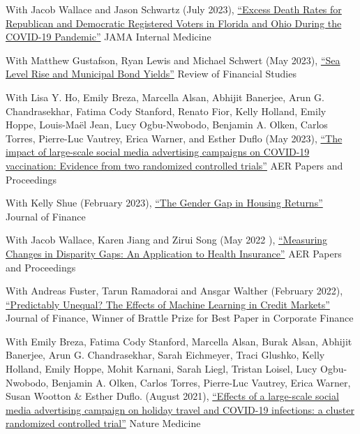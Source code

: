 \documentclass[letterpaper]{article}
\renewenvironment{itemize}{
  \begin{list}{}
    { \setlength{\itemsep}{5pt}
      \setlength{\parsep}{0pt}
      \setlength{\topsep}{0pt}
      \setlength{\leftmargin}{0em} } }{
  \end{list}}
\begin{document}
\begin{itemize}
\item With Jacob Wallace and Jason Schwartz (July 2023), \href{https://jamanetwork.com/journals/jamainternalmedicine/fullarticle/2807617}{``Excess Death Rates for Republican and Democratic Registered Voters in Florida and Ohio During the COVID-19 Pandemic''} JAMA Internal Medicine
\item With Matthew Gustafson, Ryan Lewis and Michael Schwert (May 2023), \href{http://paulgp.github.io/papers/ggls_munis.pdf}{``Sea Level Rise and Municipal Bond Yields''} Review of Financial Studies
\item With Lisa Y. Ho, Emily Breza, Marcella Alsan, Abhijit Banerjee, Arun G. Chandrasekhar, Fatima Cody Stanford, Renato Fior, Kelly Holland, Emily Hoppe, Louis-Maël Jean, Lucy Ogbu-Nwobodo, Benjamin A. Olken, Carlos Torres, Pierre-Luc Vautrey, Erica Warner, and Esther Duflo (May 2023), \href{https://paulgp.github.io/papers/submission_manuscript_appendix_social_media_covid_vaccines.pdf}{``The impact of large-scale social media advertising campaigns on COVID-19 vaccination: Evidence from two randomized controlled trials''} AER Papers and Proceedings
\item With Kelly Shue (February 2023), \href{https://paulgp.github.io/papers/Gender_Gap_in_Housing_Returns.pdf}{``The Gender Gap in Housing Returns''} Journal of Finance
\item  With Jacob Wallace, Karen Jiang and Zirui Song (May 2022 ), \href{https://paulgp.github.io/papers/aerpp_medicare.pdf}{``Measuring Changes in Disparity Gaps: An Application to Health Insurance''} AER Papers and Proceedings
\item With Andreas Fuster, Tarun Ramadorai and Ansgar Walther (February 2022), \href{https://papers.ssrn.com/sol3/papers.cfm?abstract_id=3072038}{``Predictably Unequal? The Effects of Machine Learning in Credit Markets''} Journal of Finance, Winner of Brattle Prize for Best Paper in Corporate Finance
\item With Emily Breza, Fatima Cody Stanford, Marcella Alsan, Burak Alsan, Abhijit Banerjee, Arun G. Chandrasekhar, Sarah Eichmeyer, Traci Glushko, Kelly Holland, Emily Hoppe, Mohit Karnani, Sarah Liegl, Tristan Loisel, Lucy Ogbu-Nwobodo, Benjamin A. Olken, Carlos Torres, Pierre-Luc Vautrey, Erica Warner, Susan Wootton \& Esther Duflo. (August 2021), \href{https://www.nature.com/articles/s41591-021-01487-3.pdf}{``Effects of a large-scale social media advertising campaign on holiday travel and COVID-19 infections: a cluster randomized controlled trial''} Nature Medicine  

\end{itemize}
\end{document}
